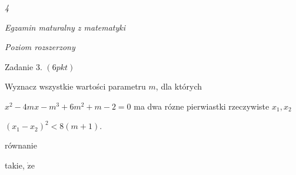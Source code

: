 \documentclass[a4paper,12pt]{article}
\begin{document}
{\it 4}

{\it Egzamin maturalny z matematyki}

{\it Poziom rozszerzony}

Zadanie 3. $(6pkt)$

Wyznacz wszystkie wartości parametru $m$, dla których

$x^{2}-4mx-m^{3}+6m^{2}+m-2=0$ ma dwa rózne pierwiastki rzeczywiste $x_{1}, x_{2}$

$(x_{1}-x_{2})^{2}<8(m+1).$

równanie

takie, $\dot{\mathrm{z}}\mathrm{e}$
\end{document}
